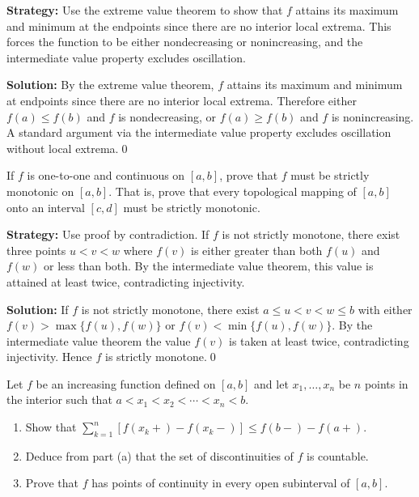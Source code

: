 \noindent\textbf{Strategy:} Use the extreme value theorem to show that $f$ attains its maximum and minimum at the endpoints since there are no interior local extrema. This forces the function to be either nondecreasing or nonincreasing, and the intermediate value property excludes oscillation.

\bigskip\noindent\textbf{Solution:}
By the extreme value theorem, $f$ attains its maximum and minimum at endpoints since there are no interior local extrema. Therefore either $f(a)\le f(b)$ and $f$ is nondecreasing, or $f(a)\ge f(b)$ and $f$ is nonincreasing. A standard argument via the intermediate value property excludes oscillation without local extrema.\qed



\begin{problembox}
\begin{problemstatement}
If $f$ is one-to-one and continuous on $[a, b]$, prove that $f$ must be strictly monotonic on $[a, b]$. That is, prove that every topological mapping of $[a, b]$ onto an interval $[c, d]$ must be strictly monotonic.
\end{problemstatement}
\end{problembox}

\noindent\textbf{Strategy:} Use proof by contradiction. If $f$ is not strictly monotone, there exist three points $u < v < w$ where $f(v)$ is either greater than both $f(u)$ and $f(w)$ or less than both. By the intermediate value theorem, this value is attained at least twice, contradicting injectivity.

\bigskip\noindent\textbf{Solution:}
If $f$ is not strictly monotone, there exist $a\le u<v<w\le b$ with either $f(v)>\max\{f(u),f(w)\}$ or $f(v)<\min\{f(u),f(w)\}$. By the intermediate value theorem the value $f(v)$ is taken at least twice, contradicting injectivity. Hence $f$ is strictly monotone.\qed



\begin{problembox}
\begin{problemstatement}
Let $f$ be an increasing function defined on $[a, b]$ and let $x_1, \ldots, x_n$ be $n$ points in the interior such that $a < x_1 < x_2 < \cdots < x_n < b$.
\begin{enumerate}[label=(\alph*)]
\item Show that $\sum_{k=1}^n [f(x_k+) - f(x_k-)] \leq f(b-) - f(a+)$.
\item Deduce from part (a) that the set of discontinuities of $f$ is countable.
\item Prove that $f$ has points of continuity in every open subinterval of $[a, b]$.
\end{enumerate}
\end{problemstatement}
\end{problembox}


